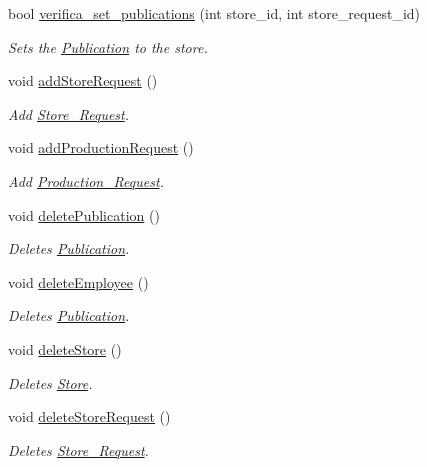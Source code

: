 \begin{DoxyCompactItemize}
bool \hyperlink{class_headquarters_a33d7a21771cada0e0af7135c36f6a19d}{verifica\+\_\+set\+\_\+publications} (int store\+\_\+id, int store\+\_\+request\+\_\+id)
\begin{DoxyCompactList}\small\item\em Sets the \hyperlink{class_publication}{Publication} to the store. \end{DoxyCompactList}\item 
void \hyperlink{class_headquarters_a260cfd15b81cd073a2b597ac892a2142}{add\+Store\+Request} ()
\begin{DoxyCompactList}\small\item\em Add \hyperlink{class_store___request}{Store\+\_\+\+Request}. \end{DoxyCompactList}\item 
void \hyperlink{class_headquarters_acc151cbc13eaee84fdd6ac8d2bdf83bb}{add\+Production\+Request} ()
\begin{DoxyCompactList}\small\item\em Add \hyperlink{class_production___request}{Production\+\_\+\+Request}. \end{DoxyCompactList}\item 
void \hyperlink{class_headquarters_a53dc212f35caf7e89661c0dfa000858f}{delete\+Publication} ()
\begin{DoxyCompactList}\small\item\em Deletes \hyperlink{class_publication}{Publication}. \end{DoxyCompactList}\item 
void \hyperlink{class_headquarters_acf608a712eb8c756149f21ab1d6b38f5}{delete\+Employee} ()
\begin{DoxyCompactList}\small\item\em Deletes \hyperlink{class_publication}{Publication}. \end{DoxyCompactList}\item 
void \hyperlink{class_headquarters_a39ceab5aab4576d7d082dd6e3c3cb2b5}{delete\+Store} ()
\begin{DoxyCompactList}\small\item\em Deletes \hyperlink{class_store}{Store}. \end{DoxyCompactList}\item 
void \hyperlink{class_headquarters_a23aa276f89e9841bede6780c4bff341e}{delete\+Store\+Request} ()
\begin{DoxyCompactList}\small\item\em Deletes \hyperlink{class_store___request}{Store\+\_\+\+Request}. \end{DoxyCompactList}\item 

\end{DoxyCompactItemize}

